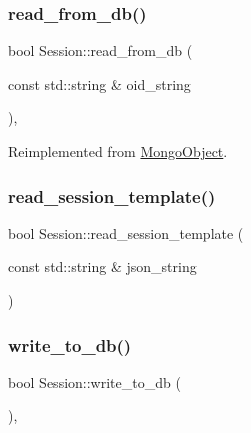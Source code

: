 \mbox{\label{class_session_a4f09644fd155a1d5640cedefe4aa42fc}} 
\subsubsection{\texorpdfstring{read\+\_\+from\+\_\+db()}{read\_from\_db()}}
{\footnotesize\ttfamily bool Session\+::read\+\_\+from\+\_\+db (\begin{DoxyParamCaption}\item[{const std\+::string \&}]{oid\+\_\+string }\end{DoxyParamCaption})\hspace{0.3cm}{\ttfamily [final]}, {\ttfamily [virtual]}}



Reimplemented from \hyperlink{class_mongo_object_a729412e226c9964e13ba80688c3f5e00}{Mongo\+Object}.

\mbox{\label{class_session_adb03e68fc271cf09c0175cb908b4afff}} 
\subsubsection{\texorpdfstring{read\+\_\+session\+\_\+template()}{read\_session\_template()}}
{\footnotesize\ttfamily bool Session\+::read\+\_\+session\+\_\+template (\begin{DoxyParamCaption}\item[{const std\+::string \&}]{json\+\_\+string }\end{DoxyParamCaption})}

\mbox{\label{class_session_a513e5436b4c990985300246bb39d9f5c}} 
\subsubsection{\texorpdfstring{write\+\_\+to\+\_\+db()}{write\_to\_db()}}
{\footnotesize\ttfamily bool Session\+::write\+\_\+to\+\_\+db (\begin{DoxyParamCaption}{ }\end{DoxyParamCaption})\hspace{0.3cm}{\ttfamily [final]}, {\ttfamily [virtual]}}



